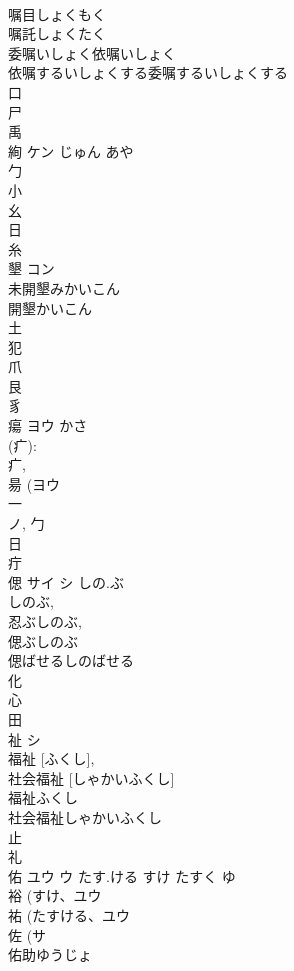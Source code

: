 \documentclass[8pt]{extreport}
\begin{document}
\begin{CJK}{UTF8}{min}
\\	嘱目しょくもく
\\	嘱託しょくたく
\\	委嘱いしょく依嘱いしょく
\\	依嘱するいしょくする委嘱するいしょくする
\\	口 
\\	尸 
\\	禹 
\\	絢	ケン	じゅん あや	
\\	勹 
\\	小 
\\	幺 
\\	日 
\\	糸 
\\	墾	コン		
\\	未開墾みかいこん
\\	開墾かいこん
\\	土 
\\	犯 
\\	爪 
\\	艮 
\\	豸 
\\	瘍	ヨウ	かさ	
\\	(疒): 
\\	疒, 
\\	昜 (ヨウ 
\\	一 
\\	ノ, 勹 
\\	日 
\\	疔 
\\	偲	サイ シ	しの.ぶ	
\\	しのぶ, 
\\	忍ぶしのぶ, 
\\	偲ぶしのぶ 
\\	偲ばせるしのばせる 
\\	化 
\\	心 
\\	田 
\\	祉	シ		
\\	福祉 [ふくし], 
\\	社会福祉 [しゃかいふくし] 
\\	福祉ふくし
\\	社会福祉しゃかいふくし
\\	止 
\\	礼 
\\	佑	ユウ ウ	たす.ける すけ たすく ゆ	
\\	裕 (すけ、ユウ 
\\	祐 (たすける、ユウ 
\\	佐 (サ 
\\	佑助ゆうじょ

\end{CJK}
\end{document}
